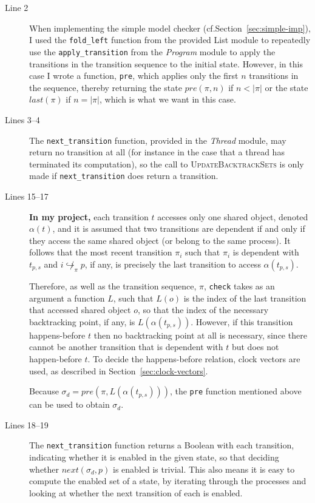 \documentclass[12pt,a4paper,twoside,openright]{report}
\begin{document}
\begin{description}
	\item[Line 2] When implementing the simple
	model checker (cf.\@ Section~\ref{sec:simple-imp}),
	I used the \texttt{fold\_left}
	function from the provided List module to
	repeatedly use the \texttt{apply\_transition}
	from the \textit{Program} module to apply
	the transitions in the transition sequence
	to the initial state. However, in this case
	I wrote a function, \texttt{pre},
	which applies only the first
	$n$ transitions in the sequence,
	thereby returning the state
	$\textit{pre}(\pi, n)$ if $n < |\pi|$
	or the state $\textit{last}(\pi)$ if
	$n = |\pi|$, which is what we want in
	this case.

	\item[Lines 3--4] The \texttt{next\_transition}
	function, provided in the \textit{Thread} module,
	may return no transition at all (for instance
	in the case that a thread has terminated its
	computation), so the call to 
	\textsc{UpdateBacktrackSets} is only made if
	\texttt{next\_transition} does return a
	transition.

	\item[Lines 15--17] \textbf{In my project,}
	each transition $t$ accesses only one shared
	object, denoted $\alpha(t)$,
	and it is assumed that two transitions are
	dependent if and only if they access
	the same shared object (or belong to the
	same process). It follows that the most
	recent transition $\pi_i$ such that
	$\pi_i$ is dependent with $t_{p,s}$
	and $i \not\hookrightarrow_\pi p$,
	if any,
	is precisely the last transition
	to access $\alpha(t_{p,s})$.

	Therefore, as well as the transition
	sequence, $\pi$, \texttt{check} takes
	as an argument 
	a function $L$, such that $L(o)$ is the
	index of the last transition that accessed
	shared object $o$, so that the index of the
	necessary backtracking point, if any, is
	$L(\alpha(t_{p,s}))$. However, if
	this transition happens-before
	$t$ then no backtracking point at all
	is necessary, since there cannot be another
	transition that is dependent with $t$
	but does not happen-before $t$. To
	decide the happens-before relation,
	clock vectors are used, as described 
	in Section~\ref{sec:clock-vectors}.

	Because	$\sigma_d = pre(\pi, L(\alpha(t_{p,s})))$,
	the \texttt{pre} function mentioned above can be
	used to obtain $\sigma_d$.

	\item[Lines 18--19]	The \texttt{next\_transition} function
	returns a Boolean with each transition, indicating whether
	it is enabled in the given state, so that deciding whether
	$\textit{next}(\sigma_d,p)$ is enabled is trivial.
	This also
	means it is easy to compute the enabled
	set of a state, by iterating through the processes
	and looking at whether the next transition of each
	is enabled.


\end{description}
\end{document}
